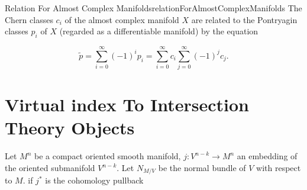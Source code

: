 \documentclass{book}
\begin{document}
\begin{Proof}
  \cite[theorem~4.5.1]{hirzebruchTopologicalMethodsAlgebraic1995}
\end{Proof}

\begin{thm}{Relation For Almost Complex Manifolds}{relationForAlmostComplexManifolds}
  The Chern classes $c_i$ of the almost complex manifold $X$ are related to the Pontryagin classes $p_i$ of $X$ (regarded as a differentiable manifold) by the equation

  \[
      \tilde{p} = \sum_{i=0}^{\infty} (-1)^i p_i = \sum_{i=0}^{\infty} c_i \sum_{j=0}^{\infty} (-1)^j c_j.
  \]

\end{thm}

\begin{Proof}
  \cite[theorem~4.6.1]{hirzebruchTopologicalMethodsAlgebraic1995}
\end{Proof}

\section{Virtual index To Intersection Theory Objects}

Let $M^n$ be a compact oriented smooth manifold, $j: V^{n-k} \to M^n$  an embedding of the oriented
submanifold $V^{n-k}$. Let $N_{M/V}$ be the normal bundle of $V$ with respect to $M$. if $j^*$ is the
cohomology pullback
\end{document}
